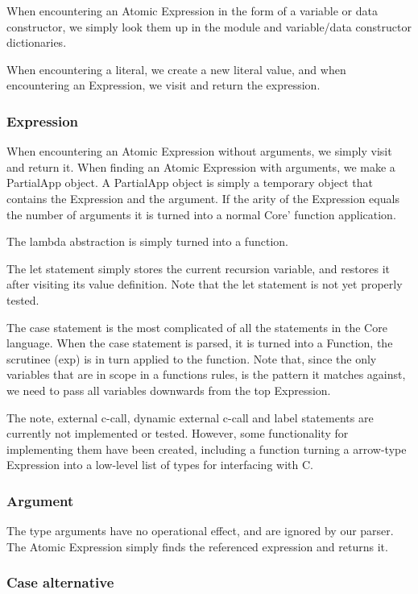 When encountering an Atomic Expression in the form of a variable or data constructor, 
we simply look them up in the module and variable/data constructor dictionaries.

When encountering a literal, we create a new literal value, and when encountering an
Expression, we visit and return the expression.

\subsubsection{Expression}

When encountering an Atomic Expression without arguments, we simply visit and return
it. When finding an Atomic Expression with arguments, we make a PartialApp object.
A PartialApp object is simply a temporary object that contains the Expression and the
argument. If the arity of the Expression equals the number of arguments it is turned
into a normal Core' function application.

The lambda abstraction is simply turned into a function.

The let statement simply stores the current recursion variable, and restores it after
visiting its value definition. Note that the let statement is not yet properly tested.

The case statement is the most complicated of all the statements in the Core language.
When the case statement is parsed, it is turned into a Function, the scrutinee (exp) 
is in turn applied to the function. Note that, since the only variables that are in
scope in a functions rules, is the pattern it matches against, we need to pass all 
variables downwards from the top Expression.

The note, external c-call, dynamic external c-call and label statements are currently
not implemented or tested. However, some functionality for implementing them have been
created, including a function turning a arrow-type Expression into a low-level list
of types for interfacing with C.

\subsubsection{Argument}

The type arguments have no operational effect, and are ignored by our parser.
The Atomic Expression simply finds the referenced expression and returns it.

\subsubsection{Case alternative}

